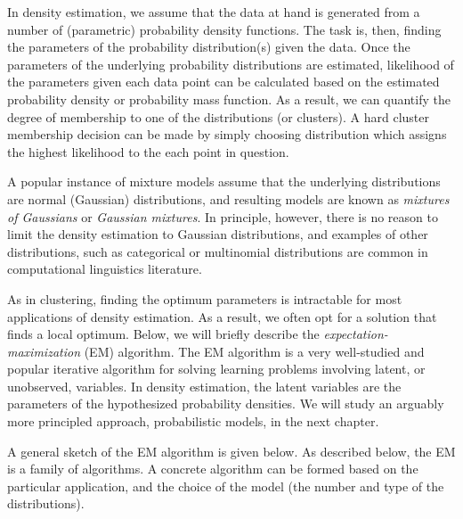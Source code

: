 In density estimation,
we assume that the data at hand is generated from a number of
(parametric) probability density functions.
The task is, then,
finding the parameters of the probability distribution(s) given the data.
Once the parameters of the underlying probability distributions are estimated,
likelihood of the parameters given each data point can be calculated
based on the estimated probability density or probability mass function.%
As a result, we can quantify the degree of membership to
one of the distributions (or clusters).
A hard cluster membership decision can be made
by simply choosing distribution which assigns the highest likelihood to
the each point in question.

A popular instance of mixture models assume that
the underlying distributions are 
normal (Gaussian) distributions,
and resulting models are known as \emph{mixtures of Gaussians}
or \emph{Gaussian mixtures}.
In principle, however,
there is no reason to limit the density estimation to Gaussian distributions,
and examples of other distributions,
such as categorical or multinomial distributions are common
in computational linguistics literature.

As in clustering,
finding the optimum parameters is intractable
for most applications of density estimation.
As a result,
we often opt for a solution that finds a local optimum.
Below, we will briefly describe
the \emph{expectation-maximization} (EM) algorithm.
The EM algorithm is a very well-studied and popular iterative algorithm
for solving learning problems involving latent, or unobserved, variables.
In density estimation, the latent variables are
the parameters of the hypothesized probability densities. 
We will study an arguably more principled approach,
probabilistic models, in the next chapter.

A general sketch of the EM algorithm is given below.
As described below,
the EM is a family of algorithms.
A concrete algorithm can be formed based on the particular application,
and the choice of the model (the number and type of the distributions).

